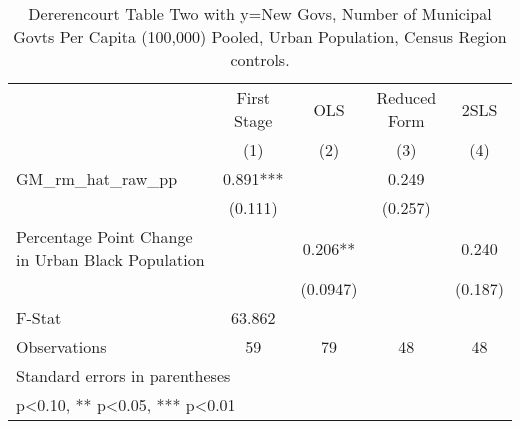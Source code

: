 \begin{table}[htbp]\centering
\def\sym#1{\ifmmode^{#1}\else\(^{#1}\)\fi}
\caption{Dererencourt Table Two with y=New Govs, Number of Municipal Govts Per Capita (100,000) Pooled, Urban Population, Census Region controls.}
\begin{tabular}{l*{4}{c}}
\toprule
                    & First Stage   &         OLS   &Reduced Form   &        2SLS   \\
                    &\multicolumn{1}{c}{(1)}   &\multicolumn{1}{c}{(2)}   &\multicolumn{1}{c}{(3)}   &\multicolumn{1}{c}{(4)}   \\
\midrule
GM\_rm\_hat\_raw\_pp    &       0.891***&               &       0.249   &               \\
                    &     (0.111)   &               &     (0.257)   &               \\
\addlinespace
Percentage Point Change in Urban Black Population&               &       0.206** &               &       0.240   \\
                    &               &    (0.0947)   &               &     (0.187)   \\
\midrule
F-Stat              &      63.862   &               &               &               \\
Observations        &          59   &          79   &          48   &          48   \\
\bottomrule
\multicolumn{5}{l}{\footnotesize Standard errors in parentheses}\\
\multicolumn{5}{l}{\footnotesize * p<0.10, ** p<0.05, *** p<0.01}\\
\end{tabular}
\end{table}

